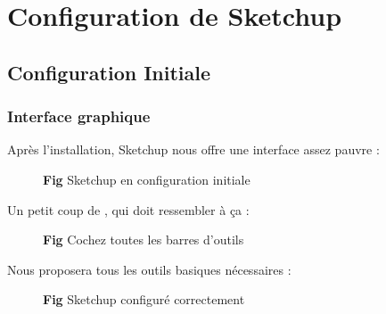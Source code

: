 \documentclass[a4paper,12pt,french]{sphinxmanual}
\begin{document}
\section{Configuration de Sketchup}
\label{su/config-su:config-su}\label{su/config-su::doc}\label{su/config-su:configuration-de-sketchup}

\subsection{Configuration Initiale}
\label{su/config-su:configuration-initiale}

\subsubsection{Interface graphique}
\label{su/config-su:interface-graphique}
Après l'installation, Sketchup nous offre une interface assez pauvre :
\begin{figure}[htbp]
\centering
\capstart

\noindent{}
\caption{\textbf{Fig} Sketchup en configuration initiale}\label{su/config-su:id1}\end{figure}

Un petit coup de , qui doit ressembler à ça :
\begin{figure}[htbp]
\centering
\capstart

\noindent{}
\caption{\textbf{Fig} Cochez toutes les barres d'outils}\label{su/config-su:id2}\end{figure}

Nous proposera tous les outils basiques nécessaires :
\begin{figure}[htbp]
\centering
\capstart

\noindent{}
\caption{\textbf{Fig} Sketchup configuré correctement}\label{su/config-su:id3}\end{figure}
\end{document}

